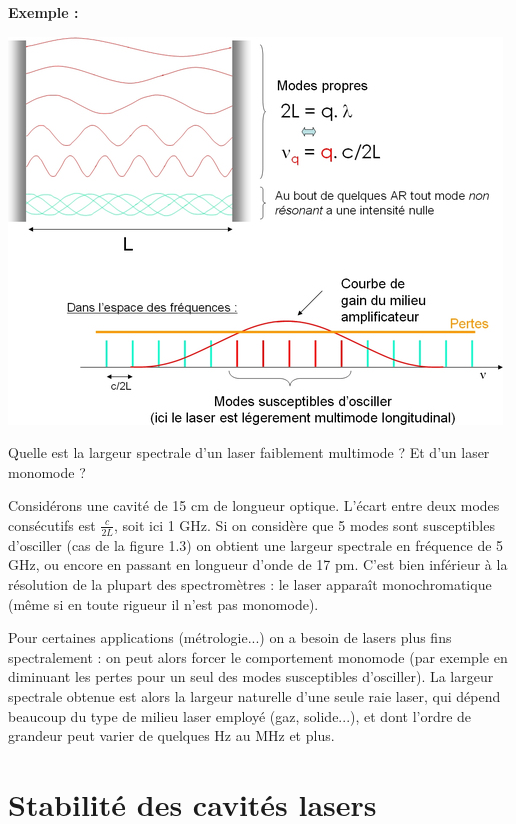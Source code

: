 \documentclass{book}
\begin{document}
\textbf{\color{exemple1}Exemple :}  
\begin{mdframed}[linecolor=exemple1, backgroundcolor=exemple2]

{\centering
\includegraphics[scale=1.7]{images/fig03.jpg}
\par}

Quelle est la largeur spectrale d'un laser faiblement multimode ? Et d'un laser monomode ?

Considérons une cavité de 15 cm de longueur optique. L'écart entre deux modes consécutifs est $\frac c {2L}$, soit ici 1 GHz. Si on considère que 5 modes sont susceptibles d'osciller (cas de la figure 1.3) on obtient une largeur spectrale en fréquence de 5 GHz, ou encore en passant en longueur d'onde de 17 pm. C'est bien inférieur à la résolution de la plupart des spectromètres : le laser apparaît monochromatique (même si en toute rigueur il n'est pas monomode).

Pour certaines applications (métrologie...) on a besoin de lasers plus fins spectralement : on peut alors forcer le comportement monomode (par exemple en diminuant les pertes pour un seul des modes susceptibles d'osciller). La largeur spectrale obtenue est alors la largeur naturelle d'une seule raie laser, qui dépend beaucoup du type de milieu laser employé (gaz, solide...), et dont l'ordre de grandeur peut varier de quelques Hz au MHz et plus.
\end{mdframed}

\section{Stabilité des cavités lasers}
\end{document}
